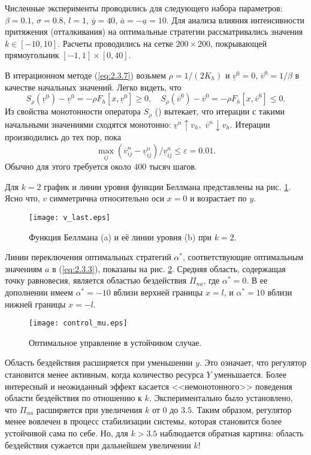 Численные эксперименты проводились для следующего набора параметров: $\beta=0.1$, $\sigma=0.8$, $l=1$, $\overline y=40$, $\overline a=-\underline a=10$. Для анализа влияния интенсивности притяжения (отталкивания) на оптимальные стратегии рассматривались значения $k \in [-10,10]$. Расчеты проводились на сетке $200\times 200$, покрывающей прямоугольник $[-1,1]\times[0,40]$.

В итерационном методе (\ref{eq:2.3.7}) возьмем $\rho=1/(2 K_h)$ и $\underline v^0=0$, $\overline v^0= 1/ \beta$ в качестве начальных значений. Легко видеть, что
$$ S_\rho(\underline v^0)-\underline v^0=-\rho F_h[x,\underline v^0]\ge 0,\quad
   S_\rho(\overline v^0)-\overline v^0=-\rho F_h[x,\overline v^0]\le 0.$$
Из свойства монотонности оператора $S_\rho$ (\cite[теорема 6]{Obe06}) вытекает, что итерации с такими начальными значениями сходятся монотонно:
$\underline v^n\uparrow v_h,$ $\overline v^n\downarrow v_h.$ Итерации производились до тех пор, пока
\begin{equation} \label{eq:2.3.8}
\max_{ij}({\overline v^n_{ij}-\underline v^n_{ij}})/\underline v^n_{ij}\le\varepsilon=0.01.
\end{equation}
Обычно для этого требуется около $400$ тысяч шагов.

Для $k=2$ график и линии уровня функции Беллмана представлены на рис. \ref{fig:2.1}. Ясно что, $v$ симметрична относительно оси $x=0$ и возрастает по $y$.
\begin{figure}[ht!]
        \centering
       \texttt{[image: v\_last.eps]}
         \caption{Функция Беллмана (a) и её линии уровня (b) при $k=2$.}
         \label{fig:2.1}
\end{figure}

Линии переключения оптимальных стратегий $\alpha^*$, соответствующие оптимальным значениям $a$ в (\ref{eq:2.3.3}), показаны на рис. \ref{fig:2.2}. Средняя область, содержащая точку равновесия, является областью бездействия $\Pi_{na}$, где $\alpha^*=0$. В ее дополнении имеем $\alpha^*=-10$ вблизи верхней границы $x=l$, и $\alpha^*=10$ вблизи нижней границы $x=-l$.

\begin{figure}[ht!]
      \centering
          \texttt{[image: control\_mu.eps]}
        \caption{Оптимальное управление в устойчивом случае.}
        \label{fig:2.2}
\end{figure}

Область бездействия расширяется при уменьшении $y$. Это означает, что регулятор становится менее активным, когда количество ресурса $Y$ уменьшается. Более интересный и неожиданный эффект касается <<немонотонного>> поведения области бездействия по отношению к $k$. Экспериментально было установлено, что $\Pi_{na}$ расширяется при увеличения $k$ от $0$ до $3.5$. Таким образом, регулятор менее вовлечен в процесс стабилизации системы, которая становится более устойчивой сама по себе. Но, для      $k>3.5$ наблюдается обратная картина: область бездействия сужается при дальнейшем увеличении $k$!


